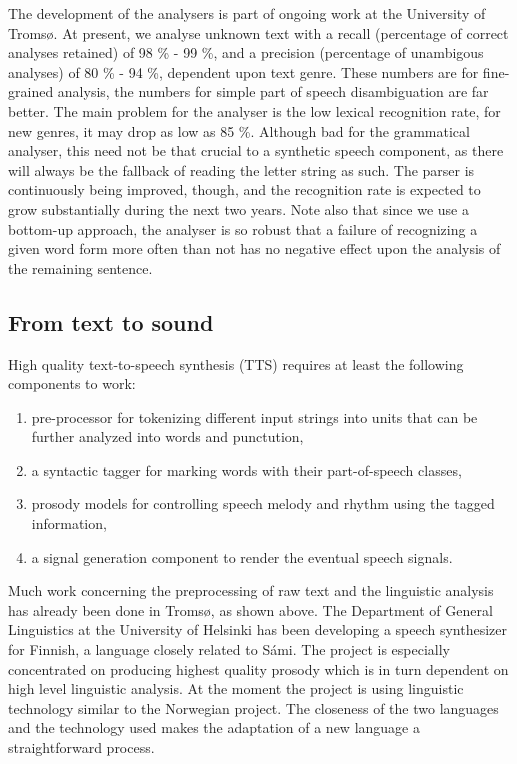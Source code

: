 \documentclass[a4paper,english]{article}
\begin{document}
The development of the analysers is part of ongoing work at the University of Tromsø. At present, we analyse unknown text with a recall (percentage of correct analyses retained) of 98 \% - 99 \%, and a precision (percentage of unambigous analyses) of 80 \% - 94 \%, dependent upon text genre. These numbers are for fine-grained analysis, the numbers for simple part of speech disambiguation are far better. The main problem for the analyser is the low lexical recognition rate, for new genres, it may drop as low as 85 \%. Although bad for the grammatical analyser, this need not be that crucial to a synthetic speech component, as there will always be the fallback of reading the letter string as such. The parser is continuously being improved, though, and the recognition rate is expected to grow substantially during the next two years. Note also that since we use a bottom-up approach, the analyser is so robust that a failure of recognizing a given word form more often than not has no negative effect upon the analysis of the remaining sentence.


\subsection{From text to sound}


High quality text-to-speech synthesis (TTS) requires at least the following components to work:

\begin{enumerate}
 \item pre-processor for tokenizing different input strings into units that can be further analyzed into words and punctution, 
 \item a syntactic tagger for marking words with their part-of-speech classes, 
 \item prosody models for controlling speech melody and rhythm using the tagged information, 
 \item a signal generation component to render the eventual speech signals.  
\end{enumerate} 
 
Much work concerning the preprocessing of raw text and the linguistic analysis has already been done in Tromsø, as shown above.  The Department of General Linguistics at the University of Helsinki has been developing a speech synthesizer for Finnish, a language closely related to Sámi.  The project is especially concentrated on producing highest quality prosody which is in turn dependent on high level linguistic analysis.  At the moment the project is using linguistic technology similar to the Norwegian project.  The closeness of the two languages and the technology used makes the adaptation of a new language a straightforward process.
\end{document}
